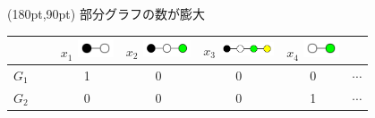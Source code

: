 \begin{textblock*}{\textwidth}(180pt,90pt)
	\alert{部分グラフの数が膨大}
\end{textblock*}

\vspace{-10pt}
\begin{table}
	\hspace{-30pt}
	\begin{tabular}{cc|ccccc}
		~ & ~ &
		\shortstack{ $x_1$ \\ \includegraphics[width=30pt]{subgraph/kw.png} } &
		\shortstack{ $x_2$ \\ \includegraphics[width=40pt]{subgraph/kwg.png} } &
		\shortstack{ $x_3$ \\ \includegraphics[width=45pt]{subgraph/kwgy.png} } &
		\shortstack{ $x_4$ \\ \includegraphics[width=30pt]{subgraph/wg.png} } &
		\raisebox{5pt}{$\cdots$} \\
		\hline
		\parbox[c][30pt][c]{0pt} {$G_1$} &  & 1 & 0 & 0 & 0  & $\cdots$ \\
		\parbox[c][30pt][c]{0pt} {$G_2$} &  & 0 & 0 & 0 & 1 & $\cdots$ \\
	\end{tabular}
\end{table}
